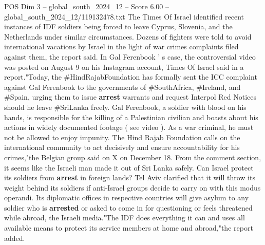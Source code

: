 \begin{textsample}{POS Dim 3 – global\_south\_2024\_12 – Score 6.00 – global\_south\_2024\_12/119132478.txt}
The Times Of Israel identified recent instances of IDF soldiers being forced to leave Cyprus, Slovenia, and the Netherlands under similar circumstances.
Dozens of fighters were told to avoid international vacations by Israel in the light of war crimes complaints filed against them, the report said.
In Gal Ferenbook ' s case, the controversial video was posted on August 9 on his Instagram account, Times Of Israel said in a report."Today, the \#HindRajabFoundation has formally sent the ICC complaint against Gal Ferenbook to the governments of \#SouthAfrica, \#Ireland, and \#Spain, urging them to issue \textbf{arrest} warrants and request Interpol Red Notices should he leave \#SriLanka freely.
Gal Ferenbook, a soldier with blood on his hands, is responsible for the killing of a Palestinian civilian and boasts about his actions in widely documented footage ( see video ).
As a war criminal, he must not be allowed to enjoy impunity.
The Hind Rajab Foundation calls on the international community to act decisively and ensure accountability for his crimes,"the Belgian group said on X on December 18.
From the comment section, it seems like the Israeli man made it out of Sri Lanka safely.
Can Israel protect its soldiers from \textbf{arrest} in foreign lands?
Tel Aviv clarified that it will throw its weight behind its soldiers if anti-Israel groups decide to carry on with this modus operandi.
Its diplomatic offices in respective countries will give asylum to any soldier who is \textbf{arrested} or asked to come in for questioning or feels threatened while abroad, the Israeli media."The IDF does everything it can and uses all available means to protect its service members at home and abroad,"the report added.

\end{textsample}

